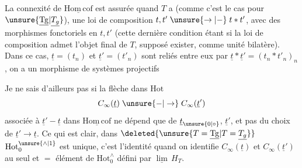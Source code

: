 La connexité de $\underline{\mathrm{Hom\,cof}}$ est assurée quand  $T$ a (comme c'est le cas pour $\unsure{\underline{\mathrm{Tg}}|\underline{T_g}}$), une loi de composition $t,t'\mathrel{\unsure{\to|-}}t*t'$, avec des morphismes fonctoriels en $t,t'$
(cette dernière condition étant 
si la loi de composition admet l'objet final de $T$, supposé exister, comme unité bilatère). Dans ce cas, $\underline t=(t_n)$ et $\underline t'=(t'_n)$ sont reliés entre eux par $\underline t*\underline t'=(t_n*t'_n)_n$,  on a un morphisme de systèmes projectifs

Je ne sais d'ailleurs pas si la flèche dans $\mathrm{Hot}$
\[
C_\infty(\underline t)\mathrel{\unsure{-|\to}}C_\infty(\underline t')
\]
associée à $\underline t'\mathrel{-}\underline t$ dans $\underline{\mathrm{Hom\,cof}}$  ne dépend que de $\underline t_{\unsure{0|\circ}}$, $\underline t'$, et pas du choix de $\underline t'\longrightarrow\underline t$. Ce qui est clair,   dans $\deleted{\unsure{T=\underline{\mathrm{Tg}}|T=\underline{T_g}}}$ $\mathrm{Hot}_0^{\unsure{\wedge|1}}$ est unique, c'est l'identité quand on identifie $C_\infty(\underline t)$ et $C_\infty(\underline t')$ au seul et $=$ élément de $\mathrm{Hot}_0^\wedge$ défini par $\underline{\lim}\,H_T$. 

